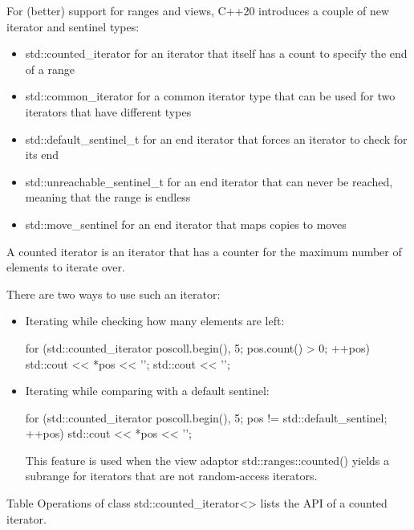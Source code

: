 
For (better) support for ranges and views, C++20 introduces a couple of new iterator and sentinel types:

\begin{itemize}
\item
std::counted\_iterator for an iterator that itself has a count to specify the end of a range

\item
std::common\_iterator for a common iterator type that can be used for two iterators that have different types

\item
std::default\_sentinel\_t for an end iterator that forces an iterator to check for its end

\item
std::unreachable\_sentinel\_t for an end iterator that can never be reached, meaning that the range is endless

\item
std::move\_sentinel for an end iterator that maps copies to moves
\end{itemize}


A counted iterator is an iterator that has a counter for the maximum number of elements to iterate over.

There are two ways to use such an iterator:

\begin{itemize}
\item
Iterating while checking how many elements are left:

\begin{cpp}
for (std::counted_iterator pos{coll.begin(), 5}; pos.count() > 0; ++pos) {
	std::cout << *pos << '\n';
}
std::cout << '\n';
\end{cpp}

\item
Iterating while comparing with a default sentinel:

\begin{cpp}
for (std::counted_iterator pos{coll.begin(), 5};
pos != std::default_sentinel; ++pos) {
	std::cout << *pos << '\n';
}
\end{cpp}

This feature is used when the view adaptor std::ranges::counted() yields a subrange for iterators that are not random-access iterators.
\end{itemize}

Table Operations of class std::counted\_iterator<> lists the API of a counted iterator.

